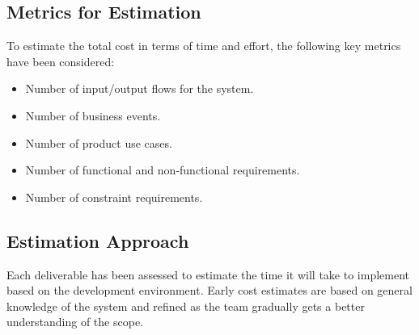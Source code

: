 \documentclass[12pt]{article}
\begin{document}
\subsection{Metrics for Estimation}
To estimate the total cost in terms of time and effort, the following
key metrics have been considered:
\begin{itemize}
  \item Number of input/output flows for the system.
  \item Number of business events.
  \item Number of product use cases.
  \item Number of functional and non-functional requirements.
  \item Number of constraint requirements.
\end{itemize}

\subsection{Estimation Approach}
Each deliverable has been assessed to estimate the time it will take
to implement based on the development environment. Early cost
estimates are based on general knowledge of the system and refined as
the team gradually gets a better understanding of the scope.
\end{document}
